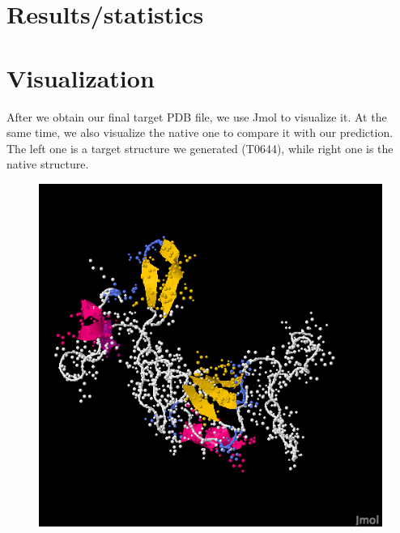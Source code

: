 \documentclass{article}
\begin{document}
\section{Results/statistics}


\newpage
\section{Visualization}

After we obtain our final target PDB file, we use Jmol to visualize it. At the same time, we also visualize the native one to compare it with our prediction.  The left one is a target structure we generated (T0644), while right one is the native structure.

\begin{figure}
\centering
\begin{minipage}{.5\textwidth}
  \centering
  \includegraphics[width=.9\linewidth]{target_group_v2}
  \label{fig:test1}
\end{minipage}%
\begin{minipage}{.5\textwidth}
  \centering

\end{minipage}
\end{figure}
\end{document}

